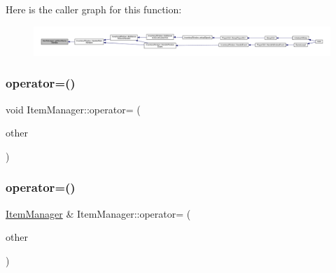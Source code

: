 Here is the caller graph for this function\+:
\nopagebreak
\begin{figure}[H]
\begin{center}
\leavevmode
\includegraphics[width=350pt]{dc/de1/class_item_manager_a60f99805e73cc978c02b1972dd988111_icgraph}
\end{center}
\end{figure}
\mbox{\label{class_item_manager_a2fc75a7db020109a6a11d6db7e56a791}} 
\subsubsection{\texorpdfstring{operator=()}{operator=()}\hspace{0.1cm}{\footnotesize\ttfamily [1/2]}}
{\footnotesize\ttfamily void Item\+Manager\+::operator= (\begin{DoxyParamCaption}\item[{\mbox{\hyperlink{class_item_manager}{Item\+Manager}} \&}]{other }\end{DoxyParamCaption})}

\mbox{\label{class_item_manager_abc96dcbccd0ed64290ea3c5297f87646}} 
\subsubsection{\texorpdfstring{operator=()}{operator=()}\hspace{0.1cm}{\footnotesize\ttfamily [2/2]}}
{\footnotesize\ttfamily \mbox{\hyperlink{class_item_manager}{Item\+Manager}} \& Item\+Manager\+::operator= (\begin{DoxyParamCaption}\item[{\mbox{\hyperlink{class_item_manager}{Item\+Manager}} \&\&}]{other }\end{DoxyParamCaption})}

\mbox{\label{class_item_manager_a70bf322ab676e3eb16850ddbcdf601d5}} 
